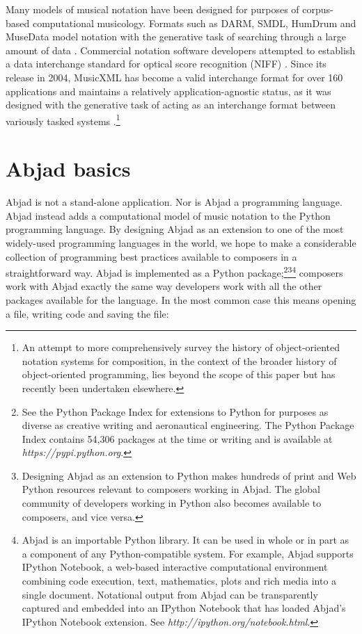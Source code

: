 \documentclass{article}
\begin{document}
Many models of musical notation have been designed for purposes of
corpus-based computational musicology. Formats such as DARM, SMDL,
HumDrum and MuseData model notation with the generative task of searching
through a large amount of data \cite{Selfridge-Field:1997ud}. Commercial
notation software developers attempted to establish a data interchange standard
for optical score recognition (NIFF) \cite{niff1995niff}. Since its release in
2004, MusicXML has become a valid interchange format for over 160 applications
and maintains a relatively application-agnostic status, as it was designed with
the generative task of acting as an interchange format between variously tasked
systems \cite{Good:2001if}.\footnote{An attempt to more
comprehensively survey the history of object-oriented notation systems for
composition, in the context of the broader history of object-oriented
programming, lies beyond the scope of this paper but has recently been
undertaken elsewhere\cite{trevino2013compositional}.}

\section{Abjad basics} \label{sec:example}

Abjad is not a stand-alone application. Nor is Abjad a programming language.
Abjad instead adds a computational model of music notation to the Python
programming language. By designing Abjad as an extension to one of the most
widely-used programming languages in the world, we hope to make a considerable
collection of programming best practices available to composers in a
straightforward way. Abjad is implemented as a Python package;\footnote{See the
Python Package Index for extensions to Python for purposes as diverse as
creative writing and aeronautical engineering. The Python Package Index
contains 54,306 packages at the time or writing and is available at
\textit{https://pypi.python.org}.}\footnote{Designing Abjad as an extension to Python makes hundreds of print and Web Python
resources relevant to composers working in Abjad. The global
community of developers working in Python also becomes available to composers,
and vice versa.}\footnote{Abjad is an importable Python library. It can be used in whole or in part as a
component of any Python-compatible system. For example, Abjad supports IPython Notebook, a web-based interactive computational environment combining code execution, text, mathematics, plots
and rich media into a single document. Notational output from Abjad can be
transparently captured and embedded into an IPython Notebook that has
loaded Abjad's IPython Notebook extension. See \textit{http://ipython.org/notebook.html}.}
composers work with Abjad exactly the same
way developers work with all the other packages available for the language. In
the most common case this means opening a file, writing code and saving the
file:
\end{document}

